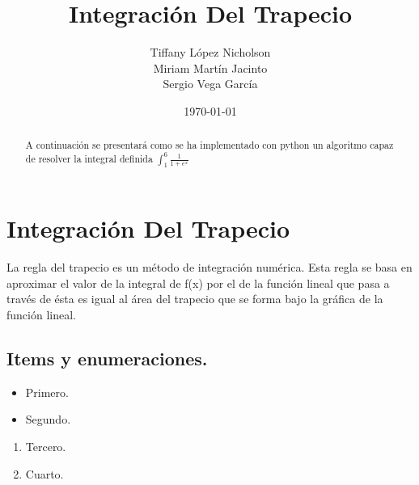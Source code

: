 \documentclass{article}
\begin{document}
  \title{Integración Del Trapecio} %
  \author{Tiffany López Nicholson \\ Miriam Martín Jacinto \\ Sergio Vega García}
  \date{\today}
  \maketitle

  \begin{abstract}
    \begin{center}
       A continuación se presentará como se ha implementado con python un algoritmo capaz de resolver la integral definida $\int_{1}^{6} \frac{1}{1+e^x}$
    \end{center}
  \end{abstract}
  \pagebreak


  \tableofcontents
  \pagebreak
  

  \section{Integración Del Trapecio}
    La regla del trapecio es un método de integración numérica. Esta regla se basa en aproximar el valor de la integral de f(x) por el de la función lineal que pasa a través  de ésta es igual al área del trapecio que se forma bajo la gráfica de la función lineal.
    \subsection{Items y enumeraciones.}
      \begin{itemize}
        \item Primero.
	\item Segundo.
      \end{itemize}
      \begin{enumerate}
        \item Tercero.
	\item Cuarto.
      \end{enumerate}
   \pagebreak
\end{document}
